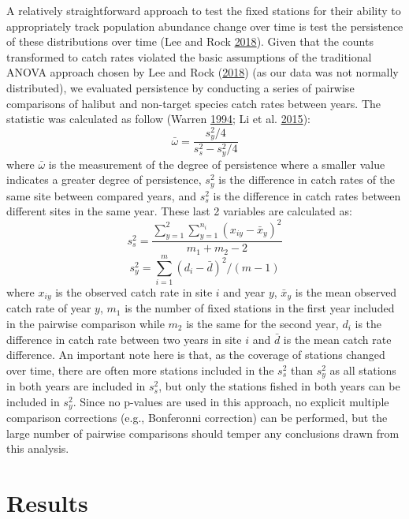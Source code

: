 \documentclass[12pt]{article}\usepackage[]{graphicx}\usepackage[]{color}
\begin{document}
A relatively straightforward approach to test the fixed stations for their ability to appropriately track population abundance change over time is test the persistence of these distributions over time (Lee and Rock \protect\hyperlink{ref-Lee2018}{2018}). Given that the counts transformed to catch rates violated the basic assumptions of the traditional ANOVA approach chosen by Lee and Rock (\protect\hyperlink{ref-Lee2018}{2018}) (as our data was not normally distributed), we evaluated persistence by conducting a series of pairwise comparisons of halibut and non-target species catch rates between years. The statistic was calculated as follow (Warren \protect\hyperlink{ref-Warren1994}{1994}; Li et al. \protect\hyperlink{ref-Li2015}{2015}):
\begin{equation}
\bar{\omega} = \frac{s^2_y/4}{s^2_s-s^2_y/4}
\end{equation}
where \(\bar{\omega}\) is the measurement of the degree of persistence where a smaller value indicates a greater degree of persistence, \(s^2_y\) is the difference in catch rates of the same site between compared years, and \(s^2_s\) is the difference in catch rates between different sites in the same year. These last 2 variables are calculated as:
\begin{equation}
s^2_s = \frac{\sum_{y=1}^2 \sum_{y=1}^{n_i} (x_{iy}-\bar{x}_y)^2}{m_1+m_2-2}
\end{equation} \begin{equation}
s^2_y = \sum_{i=1}^m (d_i - \bar{d})^2 / (m-1)
\end{equation}
where \(x_{iy}\) is the observed catch rate in site \(i\) and year \(y\), \(\bar{x}_y\) is the mean observed catch rate of year \(y\), \(m_1\) is the number of fixed stations in the first year included in the pairwise comparison while \(m_2\) is the same for the second year, \(d_i\) is the difference in catch rate between two years in site \(i\) and \(\bar{d}\) is the mean catch rate difference. An important note here is that, as the coverage of stations changed over time, there are often more stations included in the \(s^2_s\) than \(s^2_y\) as all stations in both years are included in \(s^2_s\), but only the stations fished in both years can be included in \(s^2_y\). Since no p-values are used in this approach, no explicit multiple comparison corrections (e.g., Bonferonni correction) can be performed, but the large number of pairwise comparisons should temper any conclusions drawn from this analysis.

\hypertarget{results}{%
\section{Results}\label{results}}
\end{document}
